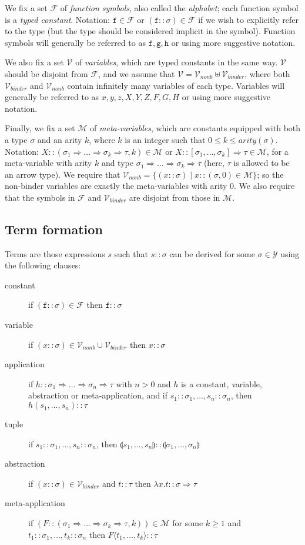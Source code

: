 \documentclass{lmcs}
\theoremstyle{theorem}\newtheorem{theorem}{Theorem}
\theoremstyle{theorem}\newtheorem{lemma}[theorem]{Lemma}
\theoremstyle{theorem}\newtheorem{corollary}[theorem]{Corollary}
\theoremstyle{definition}\newtheorem{definition}[theorem]{Definition}
\theoremstyle{definition}\newtheorem{example}[theorem]{Example}
\newcommand{\F}{\mathcal{F}}
\newcommand{\V}{\mathcal{V}}
\newcommand{\M}{\mathcal{M}}
\newcommand{\Vfree}{\mathcal{V}_{\mathit{nonb}}}
\newcommand{\Vbound}{\mathcal{V}_{\mathit{binder}}}
\newcommand{\Types}{\mathcal{Y}}
\newcommand{\atype}{\sigma}
\newcommand{\btype}{\tau}
\newcommand{\identifier}[1]{\mathtt{#1}}
\newcommand{\afun}{\identifier{f}}
\newcommand{\bfun}{\identifier{g}}
\newcommand{\cfun}{\identifier{h}}
\newcommand{\avar}{x}
\newcommand{\bvar}{y}
\newcommand{\cvar}{z}
\newcommand{\Avar}{X}
\newcommand{\Bvar}{Y}
\newcommand{\Cvar}{Z}
\newcommand{\AFvar}{F}
\newcommand{\BFvar}{G}
\newcommand{\CFvar}{H}
\newcommand{\ameta}{F}
\newcommand{\abs}[2]{\lambda #1.#2}
\newcommand{\meta}[2]{#1\langle#2\rangle}
\newcommand{\tuple}[2]{\llparenthesis #1,\dots,#2 \rrparenthesis}
\newcommand{\product}[2]{\llparenthesis #1,\dots,#2 \rrparenthesis}
\newcommand{\arity}{\mathit{arity}}
\newcommand{\arrtype}{\Rightarrow}
\begin{document}
We fix a set $\F$ of \emph{function symbols}, also called the \emph{alphabet};
each function symbol is a \emph{typed constant}. Notation: $\afun \in \F$ or
$(\afun :: \atype) \in \F$ if we wish to explicitly refer to the type (but the
type should be considered implicit in the symbol).
Function symbols will generally be referred to as $\afun,\bfun,\cfun$ or using
more suggestive notation.

We also fix a set $\V$ of \emph{variables}, which are typed constants in the
same way.  $\V$ should be disjoint from $\F$, and we assume that $\V = \Vfree
\uplus \Vbound$, where both $\Vbound$ and $\Vfree$ contain infinitely many
variables of each type.
Variables will generally be referred to as $\avar,\bvar,\cvar,\Avar,\Bvar,\Cvar,
\AFvar,\BFvar,\CFvar$ or using more suggestive notation.

Finally, we fix a set $\M$ of \emph{meta-variables}, which are constants
equipped with both a type $\atype$ and an arity $k$, where $k$ is an integer
such that $0 \leq k \leq \arity(\atype)$.  Notation:
$X :: (\atype_1 \arrtype \dots \arrtype \atype_k \arrtype \btype,k) \in \M$ or
$X :: [\atype_1,\dots,\atype_k] \arrtype \btype \in \M$, for a meta-variable
with arity $k$ and type $\atype_1 \arrtype \dots \arrtype \atype_k \arrtype
\btype$ (here, $\btype$ is allowed to be an arrow type).
We require that $\Vfree = \{ (x :: \atype) \mid x :: (\atype,0) \in \M \}$; so
the non-binder variables are exactly the meta-variables with arity
$0$.  We also require that the symbols in $\F$ and $\Vbound$ are disjoint from
those in $\M$.

\subsection{Term formation}\label{subsec:form}

Terms are those expressions $s$ such that $s :: \atype$ can be derived for some
$\atype \in \Types$ using the following clauses:

\begin{description}
\item[constant] if $(\afun :: \atype) \in \F$ then $\afun :: \atype$
\item[variable] if $(\avar :: \atype) \in \Vfree \cup \Vbound$ then $\avar ::
  \atype$
\item[application] if $h :: \atype_1 \arrtype \dots \arrtype \atype_n \arrtype
  \btype$ with $n > 0$ and $h$ is a constant, variable, abstraction or
  meta-application, and if $s_1 :: \atype_1,\dots,s_n :: \atype_n$,
  then $h(s_1,\dots,s_n) :: \btype$
\item[tuple] if $s_1 :: \atype_1,\dots,s_n :: \atype_n$, then
  $\tuple{s_1}{s_n} :: \product{\atype_1}{\atype_n}$
\item[abstraction] if $(\avar :: \atype) \in \Vbound$ and $t :: \btype$ then
  $\abs{\avar}{t} :: \atype \arrtype \btype$
\item[meta-application] if $(\ameta :: (\atype_1 \arrtype \dots \arrtype
  \atype_k \arrtype \btype,k)) \in \M$ for some $k \geq 1$ and $t_1 :: \atype_1,
  \dots,t_k :: \atype_n$ then $\meta{\ameta}{t_1,\dots,t_k} :: \btype$
\end{description}
\end{document}
